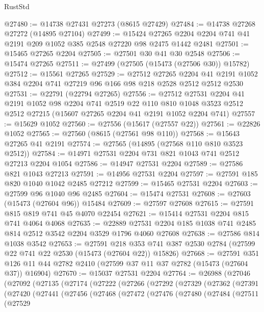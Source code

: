 \begin{lexlean}{RustStd}
\begin{coremodule}
@27480 := @14738 @27431 @27273 (@8615 @27429)
@27484 := @14738 @27268 @27272 (@14895 @27104)
@27499 := @15424
    @27265
    @2204
    @2204
    @741
    @41
    @2191
    @209
    @1052
    @385
    @2548
    @27220
    @98
    @2475
    @1442
    @2481
@27501 := @15465 @27265 @2204
@27505 := @27501 @30 @41 @30 @2548
@27506 := @15474 @27265
@27511 := @27499 (@27505 (@15473 (@27506 @30)) @15782)
@27512 := @15561 @27265
@27529 := @27512
    @27265
    @2204
    @41
    @2191
    @1052
    @384
    @2204
    @741
    @27219
    @96
    @166
    @98
    @218
    @2528
    @2512
    @2512
    @2530
@27531 := @22791 (@22794 @27265)
@27556 := @27512
    @27531
    @2204
    @41
    @2191
    @1052
    @98
    @2204
    @741
    @2519
    @22
    @110
    @810
    @1048
    @3523
    @2512
    @2512
    @27215
    (@15607 @27265 @2204 @41 @2191 @1052 @2204 @741)
@27557 := @15629 @1052
@27560 := @27556 (@15617 (@27557 @22))
@27561 := @22826 @1052
@27565 := @27560 (@8615 (@27561 @98 @110))
@27568 := @15643 @27265 @41 @2191
@27574 := @27565 (@14895 (@27568 @110 @810 @3523 @2512))
@27584 := @14971 @27531 @2204 @731 @821 @1043 @741 @2512 @27213 @2204 @1054
@27586 := @14947 @27531 @2204
@27589 := @27586 @821 @1043 @27213
@27591 := @14956 @27531 @2204
@27597 := @27591 @185 @820 @1040 @1042 @2485 @27212
@27599 := @15465 @27531 @2204
@27603 := @27599 @96 @1040 @96 @2485
@27604 := @15474 @27531
@27608 := @27603 (@15473 (@27604 @96)) @15484
@27609 := @27597 @27608
@27615 := @27591 @815 @819 @741 @45 @4070 @22454
@27621 := @15414 @27531 @2204 @815 @741 @4064 @4068
@27635 := @22889 @27531 @2204 @185 @1038 @741 @2485 @814 @2512 @3542 @2204 @3529 @1796 @4060 @27608
@27638 := @27586 @814 @1038 @3542
@27653 := @27591
    @218
    @353
    @741
    @387
    @2530
    @2784
    (@27599 @22 @741 @22 @2530 (@15473 (@27604 @22)) @15826)
@27668 := @27591
    @351
    @126
    @11
    @44
    @2782
    @2410
    (@27599 @37 @11 @37 @2782 (@15473 (@27604 @37)) @16904)
@27670 := @15037 @27531 @2204
@27764 := @26988
    (@27046
      (@27092
        (@27135
          (@27174
            (@27222
              (@27266
                (@27292
                  (@27329
                    (@27362
                      (@27391
                        (@27420
                          (@27441
                            (@27456
                              (@27468
                                (@27472
                                  (@27476
                                    (@27480
                                      (@27484
                                        (@27511
                                          (@27529

\end{coremodule}
\end{lexlean}
